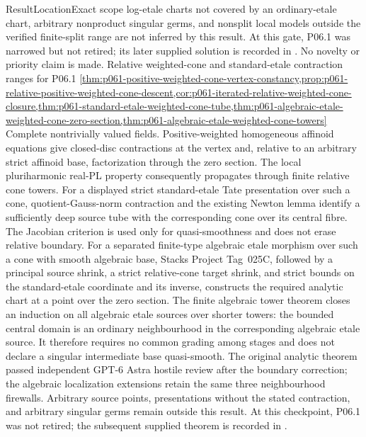 \begin{AppLProvenanceLedger}{Result}{Location}{Exact scope}
{   log-etale charts not covered by an ordinary-etale chart, arbitrary
   nonproduct singular germs, and nonsplit local models outside the verified
   finite-split range are not inferred by this result. At this gate,
   P06.1 was narrowed but not retired; its later supplied solution is
   recorded in .
   No novelty or priority claim is made.}
\AppLProvenanceRecord
  {Relative weighted-cone and standard-etale contraction ranges for P06.1}
  {\cref{thm:p061-positive-weighted-cone-vertex-constancy,prop:p061-relative-positive-weighted-cone-descent,cor:p061-iterated-relative-weighted-cone-closure,thm:p061-standard-etale-weighted-cone-tube,thm:p061-algebraic-etale-weighted-cone-zero-section,thm:p061-algebraic-etale-weighted-cone-towers}}
  {Complete nontrivially valued fields.  Positive-weighted homogeneous
   affinoid equations give closed-disc contractions at the vertex and,
   relative to an arbitrary strict affinoid base, factorization through the
   zero section.  The local pluriharmonic real-PL property consequently
   propagates through finite relative cone towers.  For a displayed strict
   standard-etale Tate presentation over such a cone, quotient-Gauss-norm
   contraction and the existing Newton lemma identify a sufficiently deep
   source tube with the corresponding cone over its central fibre.  The
   Jacobian criterion is used only for quasi-smoothness and does not erase
   relative boundary.  For a separated finite-type algebraic etale morphism
   over such a cone with smooth algebraic base, Stacks Project Tag~025C,
   followed by a principal source shrink, a strict relative-cone target
   shrink, and strict bounds on the standard-etale coordinate and its
   inverse, constructs the required analytic chart at a point over the zero
   section.  The finite algebraic tower theorem closes an induction on all
   algebraic etale sources over shorter towers: the bounded central domain is
   an ordinary neighbourhood in the corresponding algebraic etale source.
   It therefore requires no common grading among stages and does not declare
   a singular intermediate base quasi-smooth.  The original analytic theorem
   passed independent GPT-6 Astra hostile review after the boundary
   correction; the algebraic localization extensions retain the same three
   neighbourhood firewalls.  Arbitrary
   source points, presentations without the stated contraction, and
   arbitrary singular germs remain outside this result. At this checkpoint,
   P06.1 was not retired; the subsequent supplied theorem is recorded in
   .
}
\end{AppLProvenanceLedger}
